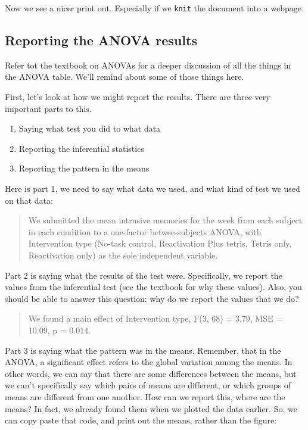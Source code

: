 \documentclass[]{book}
\providecommand{\tightlist}{%
  \setlength{\itemsep}{0pt}\setlength{\parskip}{0pt}}
\theoremstyle{definition}
\theoremstyle{definition}
\theoremstyle{definition}
\theoremstyle{remark}
\begin{document}
Now we see a nicer print out. Especially if we \texttt{knit} the
document into a webpage.

\subsection{Reporting the ANOVA
results}\label{reporting-the-anova-results}

Refer tot the textbook on ANOVAs for a deeper discussion of all the
things in the ANOVA table. We'll remind about some of those things here.

First, let's look at how we might report the results. There are three
very important parts to this.

\begin{enumerate}
\def\labelenumi{\arabic{enumi}.}
\tightlist
\item
  Saying what test you did to what data
\item
  Reporting the inferential statistics
\item
  Reporting the pattern in the means
\end{enumerate}

Here is part 1, we need to say what data we used, and what kind of test
we used on that data:

\begin{quote}
We submitted the mean intrusive memories for the week from each subject
in each condition to a one-factor betwee-subjects ANOVA, with
Intervention type (No-task control, Reactivation Plus tetris, Tetris
only, Reactivation only) as the sole independent variable.
\end{quote}

Part 2 is saying what the results of the test were. Specifically, we
report the values from the inferential test (see the textbook for why
these values). Also, you should be able to answer this question: why do
we report the values that we do?

\begin{quote}
We found a main effect of Intervention type, F(3, 68) = 3.79, MSE =
10.09, p = 0.014.
\end{quote}

Part 3 is saying what the pattern was in the means. Remember, that in
the ANOVA, a significant effect refers to the global variation among the
means. In other words, we can say that there are some differences
between the means, but we can't specifically say which pairs of means
are different, or which groups of means are different from one another.
How can we report this, where are the means? In fact, we already found
them when we plotted the data earlier. So, we can copy paste that code,
and print out the means, rather than the figure:
\end{document}
